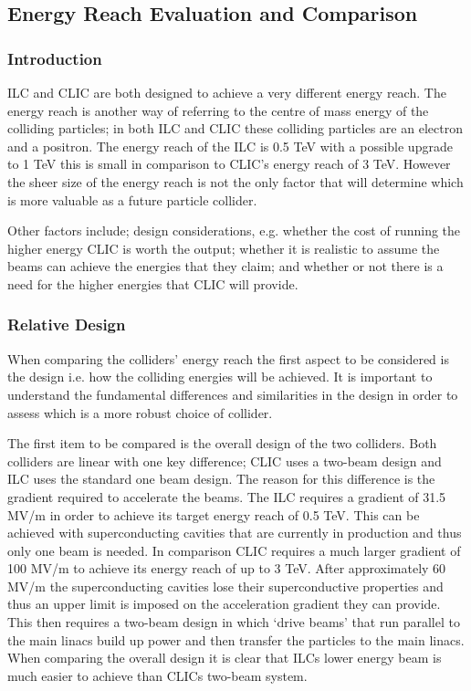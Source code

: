 \subsection{Energy Reach Evaluation and Comparison}

\subsubsection{Introduction}
ILC and CLIC are both designed to achieve a very different energy reach. The energy reach is another way of referring to the centre of mass energy of the colliding particles; in both ILC and CLIC these colliding particles are an electron and a positron.  The energy reach of the ILC is 0.5 TeV with a possible upgrade to 1 TeV this is small in comparison to CLIC's energy reach of 3 TeV. However the sheer size of the energy reach is not the only factor that will determine which is more valuable as a future particle collider.

Other factors include; design considerations, e.g. whether the cost of running the higher energy CLIC is worth the output; whether it is realistic to assume the beams can achieve the energies that they claim; and whether or not there is a need for the higher energies that CLIC will provide.

\subsubsection{Relative Design}
When comparing the colliders' energy reach the first aspect to be considered is the design i.e. how the colliding energies will be achieved. It is important to understand the fundamental differences and similarities in the design in order to assess which is a more robust choice of collider.

The first item to be compared is the overall design of the two colliders. Both colliders are linear with one key difference; CLIC uses a two-beam design and ILC uses the standard one beam design. The reason for this difference is the gradient required to accelerate the beams. The ILC requires a gradient of 31.5 MV/m\cite{ILC:ReferenceDesignReport} in order to achieve its target energy reach of 0.5 TeV. This can be achieved with superconducting cavities that are currently in production and thus only one beam is needed. In comparison CLIC requires a much larger gradient of 100 MV/m to achieve its energy reach of up to 3 TeV\cite{CLIC:ParameterList}. After approximately 60 MV/m the superconducting cavities lose their superconductive properties and thus an upper limit is imposed on the acceleration gradient they can provide. This then requires a two-beam design in which `drive beams' that run parallel to the main linacs build up power and then transfer the particles to the main linacs. When comparing the overall design it is clear that ILCs lower energy beam is much easier to achieve than CLICs two-beam system.

